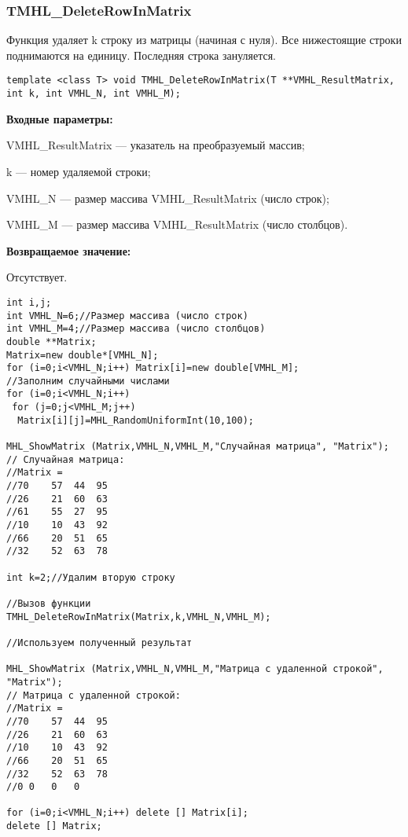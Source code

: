 \documentclass[a4paper,12pt]{article}
\begin{document}
\subsubsection{TMHL\_DeleteRowInMatrix}\label{TMHL_DeleteRowInMatrix}

Функция удаляет k строку из матрицы (начиная с нуля). Все нижестоящие строки поднимаются на единицу. Последняя строка зануляется.


\begin{lstlisting}[label=code_syntax_TMHL_DeleteRowInMatrix,caption=Синтаксис]
template <class T> void TMHL_DeleteRowInMatrix(T **VMHL_ResultMatrix, int k, int VMHL_N, int VMHL_M);
\end{lstlisting}

\textbf{Входные параметры:}  
 
VMHL\_ResultMatrix --- указатель на преобразуемый массив;
 
k --- номер удаляемой строки;
 
VMHL\_N --- размер массива VMHL\_ResultMatrix (число строк);
 
VMHL\_M --- размер массива VMHL\_ResultMatrix (число столбцов).

\textbf{Возвращаемое значение:}

Отсутствует.


\begin{lstlisting}[label=code_use_TMHL_DeleteRowInMatrix,caption=Пример использования]
int i,j;
int VMHL_N=6;//Размер массива (число строк)
int VMHL_M=4;//Размер массива (число столбцов)
double **Matrix;
Matrix=new double*[VMHL_N];
for (i=0;i<VMHL_N;i++) Matrix[i]=new double[VMHL_M];
//Заполним случайными числами
for (i=0;i<VMHL_N;i++)
 for (j=0;j<VMHL_M;j++)
  Matrix[i][j]=MHL_RandomUniformInt(10,100);

MHL_ShowMatrix (Matrix,VMHL_N,VMHL_M,"Случайная матрица", "Matrix");
// Случайная матрица:
//Matrix =
//70	57	44	95
//26	21	60	63
//61	55	27	95
//10	10	43	92
//66	20	51	65
//32	52	63	78

int k=2;//Удалим вторую строку

//Вызов функции
TMHL_DeleteRowInMatrix(Matrix,k,VMHL_N,VMHL_M);

//Используем полученный результат

MHL_ShowMatrix (Matrix,VMHL_N,VMHL_M,"Матрица с удаленной строкой", "Matrix");
// Матрица с удаленной строкой:
//Matrix =
//70	57	44	95
//26	21	60	63
//10	10	43	92
//66	20	51	65
//32	52	63	78
//0	0	0	0

for (i=0;i<VMHL_N;i++) delete [] Matrix[i];
delete [] Matrix;
\end{lstlisting}
\end{document}
